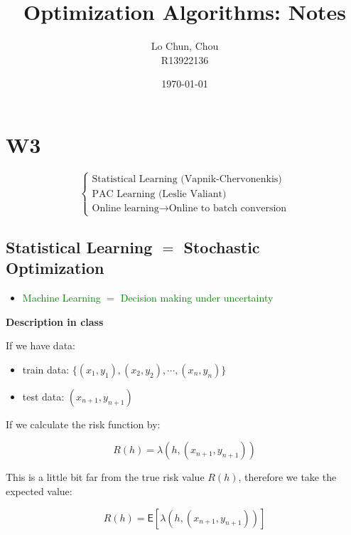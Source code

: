 \documentclass{article}
\title{Optimization Algorithms: Notes}
\author{Lo Chun, Chou \\ R13922136}
\date\today
\begin{document}
\setlength{\parindent}{0pt}
\maketitle 

\section*{W3}

\begin{equation*}
    \begin{cases}
        \text{Statistical Learning (Vapnik-Chervonenkis)} \\
        \text{PAC Learning (Leslie Valiant)} \\
        \text{Online learning} \rightarrow \text{Online to batch conversion}
    \end{cases}
\end{equation*}

\subsection*{Statistical Learning $=$ Stochastic Optimization}

\begin{itemize}
    \item \textcolor{Green}{Machine Learning $=$ Decision making under uncertainty}
\end{itemize}

\begin{center}
    \textbf{Description in class}
\end{center}

If we have data:

\begin{itemize}
    \item train data: $\{(x_1, y_1), (x_2, y_2), \cdots, (x_n, y_n)\}$  
    \item test data: $(x_{n+1}, y_{n+1})$
\end{itemize}

If we calculate the risk function by:

\begin{equation*}
    R(h) = \lambda(h, (x_{n+1}, y_{n+1}))
\end{equation*}

This is a little bit far from the true risk value $R(h)$, 
therefore we take the expected value:

\begin{equation*}
    R(h) = \mathsf{E}[\lambda(h, (x_{n+1}, y_{n+1}))]
\end{equation*}
\end{document}

